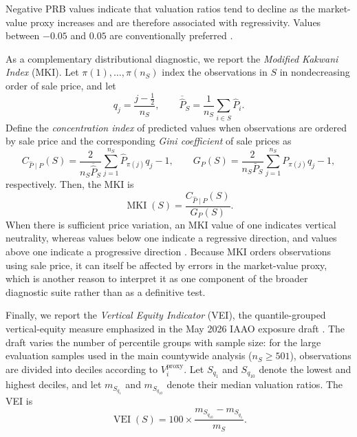 \documentclass[10pt]{article}
\theoremstyle{definition}
\newcommand{\1}{\mathbf{1}}
\begin{document}
Negative PRB values indicate that valuation ratios tend to decline as the market-value proxy increases and are therefore associated with regressivity. Values between $-0.05$ and $0.05$ are conventionally preferred \cite{IAAO2013Ratio}.

{As a complementary distributional diagnostic, we report the \emph{Modified Kakwani Index} (MKI). Let $\pi(1),\allowbreak\ldots,\pi(n_S)$ index the observations in $S$ in nondecreasing order of sale price, and let
\[
q_j=\frac{j-\tfrac12}{n_S},
\qquad
\overline{\widehat P}_S
=
\frac{1}{n_S}\sum_{i\in S}\widehat P_i.
\]
Define the \emph{concentration index} of predicted values when observations are ordered by sale price and the corresponding \emph{Gini coefficient} of sale prices as
\begin{equation}
\label{eq:mki_components}
C_{\widehat P\mid P}(S)
=
\frac{2}{n_S\overline{\widehat P}_S}
\sum_{j=1}^{n_S}
\widehat P_{\pi(j)}q_j
-1,
\qquad
G_P(S)
=
\frac{2}{n_S\bar P_S}
\sum_{j=1}^{n_S}
P_{\pi(j)}q_j
-1,
\end{equation}
respectively. Then, the MKI is
\begin{equation}
\label{eq:mki}
\operatorname{MKI}(S)
=
\frac{C_{\widehat P\mid P}(S)}{G_P(S)}.
\end{equation}
When there is sufficient price variation, an MKI value of one indicates vertical neutrality, whereas values below one indicate a regressive direction, and values above one indicate a progressive direction \cite{IAAO2026ExposureRatio}. Because MKI orders observations using sale price, it can itself be affected by errors in the market-value proxy, which is another reason to interpret it as one component of the broader diagnostic suite rather than as a definitive test.}


Finally, we report the \emph{Vertical Equity Indicator} (VEI), the quantile-grouped vertical-equity measure emphasized in the May 2026 IAAO exposure draft \cite{IAAO2026ExposureRatio}.
The draft varies the number of percentile groups with sample size: for the large evaluation samples used in the main countywide analysis ($n_S\geq 501$), observations are divided into deciles according to $V_i^{\mathrm{proxy}}$. Let $S_{q_1}$ and $S_{q_{10}}$ denote the lowest and highest deciles, and let $m_{S_{q_1}}$ and $m_{S_{q_{10}}}$ denote their median valuation ratios. The VEI is
\begin{equation}
\label{eq:vei}
\operatorname{VEI}(S)
=
100\times
\frac{m_{S_{q_{10}}}-m_{S_{q_1}}}{m_S}.
\end{equation}
\end{document}
